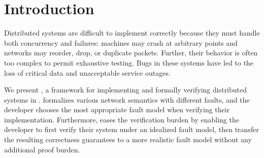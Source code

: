 \newcommand{\numcircled}[1]{\ding{\numexpr191+#1\relax}}


\newcommand{\pair}[2]{\ensuremath{\langle #1, #2 \rangle}}
\newcommand{\angles}[1]{\ensuremath{\langle #1 \rangle}}

\newcommand{\traceelt}[1]{\angles{#1}}


\newcommand{\iV}{\;\;\;\;\;}
\newcommand{\iX}{\iV\iV}
\newcommand{\iY}{\iV\iV\iV}
\newcommand{\iZ}{\iV\iV\iV\iV}
\newcommand{\NL}{\\[2pt]}
\newcommand{\BR}{\\[5pt]}

\newcommand{\coloneq}{\;\mathtt{:=}\;}
\newcommand{\consop}{\;\mathtt{::}\;}
\newcommand{\appop}{\;{\text{++}}\;}
\newcommand{\tevent}[2]{\langle #1 ,\ #2 \rangle}

\newcommand{\tracespec}{\Phi}

\newcommand{\shortcite}[1]{\cite{#1}}

\newcommand{\transfer}{\codeid{transfer}}
\newcommand{\transfert}{\codeid{transfer_T}}
\newcommand{\transform}{\codeid{transform}}
\newcommand{\unwrap}{\codeid{unwrap}}
\newcommand{\dedupnet}{\ensuremath{\codeid{dedup}_{\mathtt{net}}}}
\newcommand{\deduptrace}{\ensuremath{\codeid{dedup}_{\mathtt{trace}}}}




\section{Introduction}
\label{sec:verdi:intro}

  Distributed systems are difficult to implement correctly because they
  must handle both concurrency and failures: machines may crash at
  arbitrary points and networks may reorder, drop, or duplicate packets.
  Further, their behavior is often too complex to permit exhaustive
  testing.  Bugs in these systems have led to the loss of critical data and
  unacceptable service outages.

  We present \Verdi, a framework for implementing and formally verifying
  distributed systems in \Coq.  \Verdi formalizes various network semantics
  with different faults, and the developer chooses the most
  appropriate fault model when verifying their implementation. Furthermore,
  \Verdi eases the verification burden by enabling the developer to first verify
  their system under an idealized fault model, then transfer the resulting
  correctness guarantees to a more realistic fault model without any
  additional proof burden.

